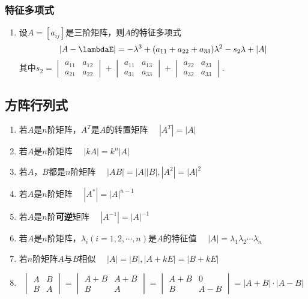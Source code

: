 \documentclass[a4paper,12pt]{article}
\begin{document}
    \subsubsection{特征多项式}
    \begin{enumerate}
        \item 设$A = [a_{ij}]$是三阶矩阵，则$A$的特征多项式
        \[
            |A - \lambdaE| = -\lambda^3 + (a_{11} + a_{22} + a_{33})\lambda^2 - s_2 \lambda + |A|
        \]其中$s_2 =
        \begin{vmatrix}
            a_{11} & a_{12} \\
            a_{21} & a_{22}
        \end{vmatrix}
        +
        \begin{vmatrix}
            a_{11} & a_{13} \\
            a_{31} & a_{33}
        \end{vmatrix}
        +
        \begin{vmatrix}
            a_{22} & a_{23} \\
            a_{32} & a_{33}
        \end{vmatrix}.$
    \end{enumerate}

    \subsection{方阵行列式}

    \begin{enumerate}
        \item 若$A$是$n$阶矩阵，$A^T$是$A$的转置矩阵 \, \Rightarrow \, $|A^T| = |A|$
        \item 若$A$是$n$阶矩阵 \, \Rightarrow \, $|kA| = k^{n}|A|$
        \item 若$A$，$B$都是$n$阶矩阵 \, \Rightarrow \, $|AB| = |A||B|, |A^2| = |A|^2$
        \item 若$A$是$n$阶矩阵 \, \Rightarrow \, $|A^*| = |A|^{n-1}$
        \item 若$A$是$n$阶\textbf{可逆}矩阵 \, \Rightarrow \, $|A^{-1}| = |A|^{-1}$
        \item 若$A$是$n$阶矩阵，$\lambda_i(i = 1, 2, \cdots, n)$是$A$的特征值 \, \Rightarrow \, $|A| = \lambda_1 \lambda_2 \cdots \lambda_n$
        \item 若$n$阶矩阵$A$与$B$相似 \, \Rightarrow \, $|A| = |B|, |A + kE| = |B + kE|$
        \item
        \[
            \begin{vmatrix}
                A & B \\
                B & A
            \end{vmatrix}
            = \begin{vmatrix}
                  A + B & A + B \\
                  B     & A
            \end{vmatrix}
            = \begin{vmatrix}
                  A + B & 0     \\
                  B     & A - B
            \end{vmatrix}
            = |A + B| \cdot |A - B|
        \]
    \end{enumerate}
\end{document}
